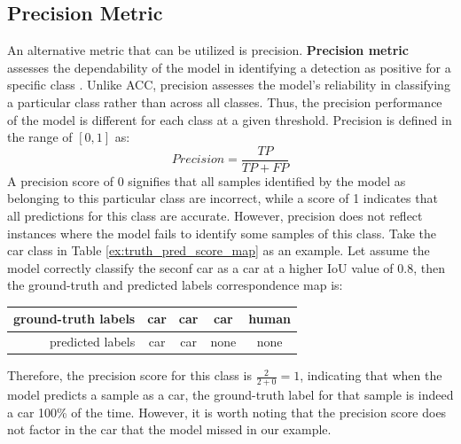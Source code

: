 \subsection{Precision Metric}  \label{subsec:precision_metric}
An alternative metric that can be utilized is precision. \textbf{Precision metric} assesses the dependability of the model in identifying a detection as positive for a specific class \cite{metrics_survey_2020}. Unlike ACC, precision assesses the model's reliability in classifying a particular class rather than across all classes. Thus, the precision performance of the model is different for each class at a given threshold. Precision is defined in the range of $[0,1]$  as:
\begin{equation}
    Precision = \frac{TP}{TP+FP} \label{eq:precision}
\end{equation}
A precision score of 0 signifies that all samples identified by the model as belonging to this particular class are incorrect, while a score of 1 indicates that all predictions for this class are accurate. However, precision does not reflect instances where the model fails to identify some samples of this class. Take the car class in Table \ref{ex:truth_pred_score_map} as an example. Let assume the model correctly classify the seconf car as a car at a higher IoU value of 0.8, then the ground-truth and predicted labels correspondence map is:
\begin{table}[H]
    \centering
    \begin{tabular}{rcccc}
    ground-truth labels         & car  & car & car  & human \\ \hline
    predicted labels            & car  & car & none & none
    \end{tabular}
\end{table}
\noindent Therefore, the precision score for this class is $\frac{2}{2+0}=1$, indicating that when the model predicts a sample as a car, the ground-truth label for that sample is indeed a car 100\% of the time. However, it is worth noting that the precision score does not factor in the car that the model missed in our example.

